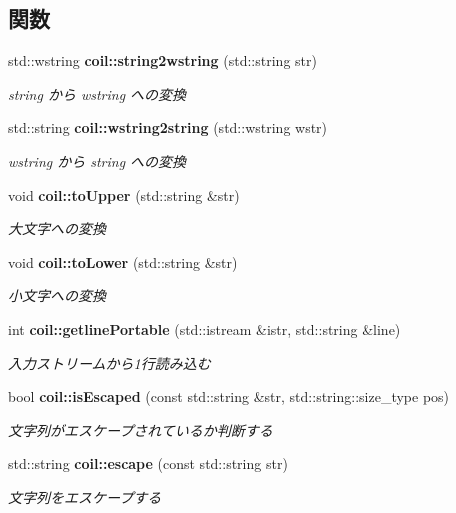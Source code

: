 \subsection*{関数}
\begin{DoxyCompactItemize}
\item 
std::wstring {\bf coil::string2wstring} (std::string str)
\begin{DoxyCompactList}\small\item\em string から wstring への変換 \item\end{DoxyCompactList}\item 
std::string {\bf coil::wstring2string} (std::wstring wstr)
\begin{DoxyCompactList}\small\item\em wstring から string への変換 \item\end{DoxyCompactList}\item 
void {\bf coil::toUpper} (std::string \&str)
\begin{DoxyCompactList}\small\item\em 大文字への変換 \item\end{DoxyCompactList}\item 
void {\bf coil::toLower} (std::string \&str)
\begin{DoxyCompactList}\small\item\em 小文字への変換 \item\end{DoxyCompactList}\item 
int {\bf coil::getlinePortable} (std::istream \&istr, std::string \&line)
\begin{DoxyCompactList}\small\item\em 入力ストリームから1行読み込む \item\end{DoxyCompactList}\item 
bool {\bf coil::isEscaped} (const std::string \&str, std::string::size\_\-type pos)
\begin{DoxyCompactList}\small\item\em 文字列がエスケープされているか判断する \item\end{DoxyCompactList}\item 
std::string {\bf coil::escape} (const std::string str)
\begin{DoxyCompactList}\small\item\em 文字列をエスケープする \item\end{DoxyCompactList}\item 

\end{DoxyCompactItemize}
